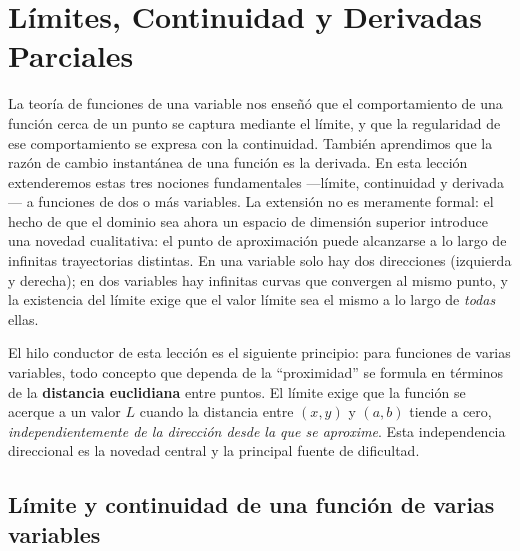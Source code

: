 
\chapter{Límites, Continuidad y Derivadas Parciales}

La teoría de funciones de una variable nos enseñó que el comportamiento
de una función cerca de un punto se captura mediante el límite, y que
la regularidad de ese comportamiento se expresa con la continuidad.
También aprendimos que la razón de cambio instantánea de una función
es la derivada. En esta lección extenderemos estas tres nociones
fundamentales —límite, continuidad y derivada— a funciones de dos o
más variables. La extensión no es meramente formal: el hecho de que
el dominio sea ahora un espacio de dimensión superior introduce una
novedad cualitativa: el punto de aproximación puede alcanzarse a lo
largo de infinitas trayectorias distintas. En una variable solo hay
dos direcciones (izquierda y derecha); en dos variables hay infinitas
curvas que convergen al mismo punto, y la existencia del límite exige
que el valor límite sea el mismo a lo largo de \emph{todas} ellas.

\begin{rem}
El hilo conductor de esta lección es el siguiente principio: para
funciones de varias variables, todo concepto que dependa de la
``proximidad'' se formula en términos de la \textbf{distancia
euclidiana} entre puntos. El límite exige que la función se acerque a
un valor $L$ cuando la distancia entre $(x,y)$ y $(a,b)$ tiende a cero,
\emph{independientemente de la dirección desde la que se aproxime}.
Esta independencia direccional es la novedad central y la principal
fuente de dificultad.
\end{rem}


\section{Límite y continuidad de una función de varias variables}

